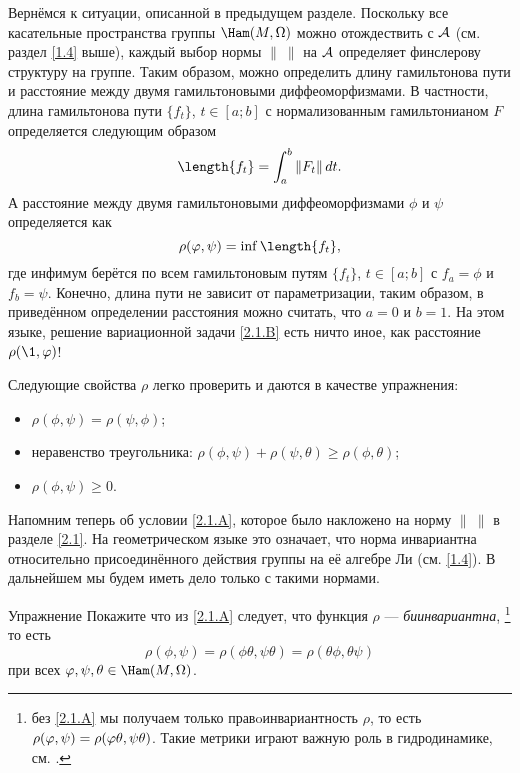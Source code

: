 Вернёмся к ситуации, описанной в предыдущем разделе.
Поскольку все касательные пространства группы $\Ham(M, \Omega)$ можно
отождествить с $\mathcal{A}$ (см. раздел \ref{1.4} выше), каждый выбор нормы
$\|\ \|$ на $\mathcal{A}$ определяет финслерову структуру на группе.
Таким образом, можно определить длину гамильтонова пути и расстояние между двумя гамильтоновыми диффеоморфизмами.
В частности, длина гамильтонова пути $\{f_t\}$, $t \in [a; b]$ с нормализованным гамильтонианом $F$ определяется следующим образом 
\[\length\{f_t\}=\int_a^b \| F_t \|\,dt.\]
А расстояние между двумя гамильтоновыми диффеоморфизмами $\phi$ и $\psi$ определяется как \index[symb]{$\rho$}
\[\rho (\phi, \psi) = \inf \length \{f_t\},\] 
где инфимум берётся по всем гамильтоновым путям $\{f_t\}$, $t \in [a; b]$ с $f_a = \phi$ и $f_b = \psi$.
Конечно, длина пути не зависит от параметризации, таким образом, в приведённом определении расстояния можно считать, что $a = 0$ и $b = 1$.
На этом языке, решение вариационной задачи
\ref{2.1.B} есть ничто иное, как расстояние $\rho (\1, \phi)$!

Следующие свойства $\rho$ легко проверить и даются в качестве упражнения:
\begin{itemize}
\item $\rho (\phi, \psi) = \rho (\psi, \phi)$;
\item неравенство треугольника: $\rho (\phi, \psi) + \rho (\psi, \theta) \ge \rho (\phi, \theta)$;
\item $\rho (\phi, \psi) \ge 0$.
\end{itemize}

Напомним теперь об условии \ref{2.1.A}, которое было накложено на норму $\|\ \|$ в разделе \ref{2.1}.
На геометрическом языке это означает, что норма инвариантна относительно присоединённого действия группы на её алгебре Ли (см. \ref{1.4}).
В дальнейшем мы будем иметь дело только с такими нормами.

\begin{ex*}{Упражнение}
Покажите что из \ref{2.1.A} следует, что функция $\rho$ --- \emph{биинвариантна},%
\footnote{без \ref{2.1.A} мы получаем только правoинвариантность $\rho$, то есть $\rho (\phi, \psi) \z= \rho (\phi\theta, \psi\theta)$.
Такие метрики играют важную роль в гидродинамике, см. \cite{AK}.}
то есть
\[\rho (\phi, \psi) = \rho (\phi \theta, \psi \theta) = \rho (\theta\phi, \theta\psi)\]
при всех $\phi, \psi, \theta \in \Ham (M, \Omega)$.
\end{ex*}

